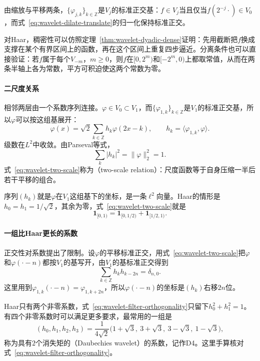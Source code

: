 由缩放与平移两条，$\{\varphi_{j,k}\}_{k\in\mathbb Z}$是$V_j$的标准正交基：$f\in V_j$当且仅当$f(2^{-j}\cdot)\in V_0$，而式~\eqref{eq:wavelet-dilate-translate}的归一化保持标准正交。

对Haar，稠密性可以仿照定理~\ref{thm:wavelet-dyadic-dense}证明：先用截断把$f$换成支撑在某个有界区间上的函数，再在这个区间上重复四步逼近。分离条件也可以直接验证：若$f$属于每个$V_{-m}$，$m\geq0$，则$f$在$[0,2^m)$和$[-2^m,0)$上都取常值，从而在两条半轴上各为常数，平方可积迫使这两个常数为零。

\paragraph{二尺度关系}
相邻两层由一个系数序列连接。$\varphi\in V_0\subset V_1$，而$\{\varphi_{1,k}\}_{k\in\mathbb Z}$是$V_1$的标准正交基，所以$\varphi$可以按这组基展开：
\begin{equation}
 \varphi(x)=\sqrt2\sum_{k\in\mathbb Z}h_k\varphi(2x-k),\qquad h_k=\langle\varphi_{1,k},\varphi\rangle.
 \label{eq:wavelet-two-scale}
\end{equation}
级数在$L^2$中收敛。由Parseval等式，
\[
 \sum_k\lvert h_k\rvert^2=\lVert\varphi\rVert_2^2=1.
\]
式~\eqref{eq:wavelet-two-scale}称为（two-scale relation）：尺度函数等于自身压缩一半后若干平移的组合。

序列$(h_k)$就是$\varphi$在$V_1$这组基下的坐标，是一条$\ell^2$向量。Haar的情形是$h_0=h_1=1/\sqrt2$，其余为零，式~\eqref{eq:wavelet-two-scale}就是
\[
 \mathbf{1}_{[0,1)}=\mathbf{1}_{[0,1/2)}+\mathbf{1}_{[1/2,1)}.
\]

\paragraph{一组比Haar更长的系数}
正交性对系数提出了限制。设$\varphi$的平移标准正交，用式~\eqref{eq:wavelet-two-scale}把$\varphi$和$\varphi(\cdot-n)$都按$V_1$的基写开，由$V_1$的基标准正交得到
\begin{equation}
 \sum_{k\in\mathbb Z}h_kh_{k-2n}=\delta_{n,0}.
 \label{eq:wavelet-filter-orthogonality}
\end{equation}
这里用到$\varphi_{1,k}(\cdot-n)=\varphi_{1,k+2n}$，所以$\varphi(\cdot-n)$的坐标是$(h_k)$右移$2n$位。

Haar只有两个非零系数，式~\eqref{eq:wavelet-filter-orthogonality}只留下$h_0^2+h_1^2=1$。有四个非零系数时可以满足更多要求，最常用的一组是
\begin{equation}
 (h_0,h_1,h_2,h_3)=\frac{1}{4\sqrt2}\bigl(1+\sqrt3,\ 3+\sqrt3,\ 3-\sqrt3,\ 1-\sqrt3\bigr),
 \label{eq:wavelet-d4-filter}
\end{equation}
称为具有$2$个消失矩的（Daubechies wavelet）的系数，记作D4。这里手算核对式~\eqref{eq:wavelet-filter-orthogonality}。

